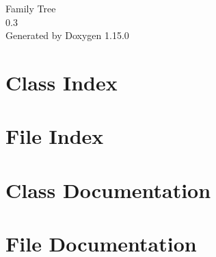 \documentclass[twoside]{book}
\newcommand{\+}{\discretionary{\mbox{\scriptsize$\hookleftarrow$}}{}{}}
\newcommand{\clearemptydoublepage}{%
    \newpage{\pagestyle{empty}\cleardoublepage}%
  }
\begin{document}
  \raggedbottom
    \hypersetup{pageanchor=false,
                bookmarksnumbered=true,
                pdfencoding=unicode
               }
  \begin{titlepage}
  \vspace*{7cm}
  \begin{center}%
  {\Large Family Tree}\\
  [1ex]\large 0.\+3 \\
  \vspace*{1cm}
  {\large Generated by Doxygen 1.15.0}\\
  \end{center}
  \end{titlepage}
  \clearemptydoublepage
  \tableofcontents
  \clearemptydoublepage
  \hypersetup{pageanchor=true}

\chapter{Class Index}

\chapter{File Index}

\chapter{Class Documentation}


\chapter{File Documentation}



  \backmatter
  \newpage
  \clearemptydoublepage
  \printindex
\end{document}

